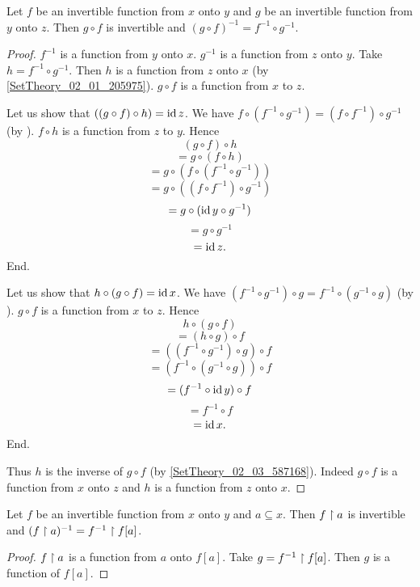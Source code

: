 \documentclass[../../sets-and-functions.ftl.tex]{subfiles}
\begin{document}
\begin{forthel}
    \begin{proposition}\label{SetTheory_02_03_430030}
      Let $f$ be an invertible function from $x$ onto $y$ and $g$ be an invertible function from $y$ onto $z$.
      Then $g \circ f$ is invertible and $(g \circ f)^{-1} = f^{-1} \circ g^{-1}$.
    \end{proposition}
    \begin{proof}
      $f^{-1}$ is a function from $y$ onto $x$.
      $g^{-1}$ is a function from $z$ onto $y$.
      Take $h = f^{-1} \circ g^{-1}$.
      Then $h$ is a function from $z$ onto $x$ (by \ref{SetTheory_02_01_205975}).
      $g \circ f$ is a function from $x$ to $z$.

      Let us show that $((g \circ f) \circ h) = \operatorname{id}{z}$.
        We have $f \circ (f^{-1} \circ g^{-1}) = (f \circ f^{-1}) \circ g^{-1}$ (by ).
        $f \circ h$ is a function from $z$ to $y$.
        Hence
        \[   (g \circ f) \circ h \]
        \[ = g \circ (f \circ h) \]
        \[ = g \circ (f \circ (f^{-1} \circ g^{-1})) \]
        \[ = g \circ ((f \circ f^{-1}) \circ g^{-1}) \]
        \[ = g \circ (\operatorname{id}{y} \circ g^{-1}) \]
        \[ = g \circ g^{-1} \]
        \[ = \operatorname{id}{z}. \]
      End.

      Let us show that $h \circ (g \circ f) = \operatorname{id}{x}$.
        We have $(f^{-1} \circ g^{-1}) \circ g = f^{-1} \circ (g^{-1} \circ g)$ (by ).
        $g \circ f$ is a function from $x$ to $z$.
        Hence
        \[   h \circ (g \circ f) \]
        \[ = (h \circ g) \circ f \]
        \[ = ((f^{-1} \circ g^{-1}) \circ g) \circ f \]
        \[ = (f^{-1} \circ (g^{-1} \circ g)) \circ f \]
        \[ = (f^{-1} \circ \operatorname{id}{y}) \circ f \]
        \[ = f^{-1} \circ f \]
        \[ = \operatorname{id}{x}. \]
      End.

      Thus $h$ is the inverse of $g \circ f$ (by \ref{SetTheory_02_03_587168}).
      Indeed $g \circ f$ is a function from $x$ onto $z$ and $h$ is a function from $z$ onto $x$.
    \end{proof}

    \begin{proposition}\label{SetTheory_02_03_908585}
      Let $f$ be an invertible function from $x$ onto $y$ and $a \subseteq x$.
      Then $f \upharpoonright a$ is invertible and $(f\upharpoonright a)^{-1} = f^{-1} \upharpoonright f[a]$.
    \end{proposition}
    \begin{proof}
      $f \upharpoonright a$ is a function from $a$ onto $f[a]$.
      Take $g = f^{-1} \upharpoonright f[a]$.
      Then $g$ is a function of $f[a]$.


\end{proof}
\end{forthel}
\end{document}
